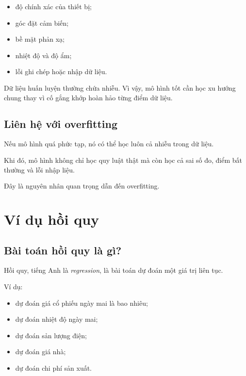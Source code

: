 \begin{itemize}
    \item độ chính xác của thiết bị;
    \item góc đặt cảm biến;
    \item bề mặt phản xạ;
    \item nhiệt độ và độ ẩm;
    \item lỗi ghi chép hoặc nhập dữ liệu.
\end{itemize}

\begin{ghinho}
Dữ liệu huấn luyện thường chứa nhiễu. Vì vậy, mô hình tốt cần học xu hướng chung thay vì cố gắng khớp hoàn hảo từng điểm dữ liệu.
\end{ghinho}

\subsection{Liên hệ với overfitting}

Nếu mô hình quá phức tạp, nó có thể học luôn cả nhiễu trong dữ liệu.

Khi đó, mô hình không chỉ học quy luật thật mà còn học cả sai số đo, điểm bất thường và lỗi nhập liệu.

Đây là nguyên nhân quan trọng dẫn đến overfitting.

\section{Ví dụ hồi quy}

\subsection{Bài toán hồi quy là gì?}

Hồi quy, tiếng Anh là \textit{regression}, là bài toán dự đoán một giá trị liên tục.

Ví dụ:

\begin{itemize}
    \item dự đoán giá cổ phiếu ngày mai là bao nhiêu;
    \item dự đoán nhiệt độ ngày mai;
    \item dự đoán sản lượng điện;
    \item dự đoán giá nhà;
    \item dự đoán chi phí sản xuất.
\end{itemize}

